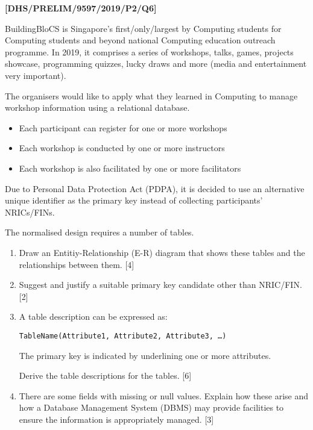 \item \textbf{{[}DHS/PRELIM/9597/2019/P2/Q6{]} }

BuildingBloCS is Singapore's first/only/largest by Computing students
for Computing students and beyond national Computing education outreach
programme. In 2019, it comprises a series of workshops, talks, games,
projects showcase, programming quizzes, lucky draws and more (media
and entertainment very important). 

The organisers would like to apply what they learned in Computing
to manage workshop information using a relational database. 
\begin{itemize}
\item Each participant can register for one or more workshops 
\item Each workshop is conducted by one or more instructors 
\item Each workshop is also facilitated by one or more facilitators 
\end{itemize}
Due to Personal Data Protection Act (PDPA), it is decided to use an
alternative unique identifier as the primary key instead of collecting
participants' NRICs/FINs.

The normalised design requires a number of tables.
\begin{enumerate}
\item Draw an Entitiy-Relationship (E-R) diagram that shows these tables
and the relationships between them. \hfill{} {[}4{]}
\item Suggest and justify a suitable primary key candidate other than NRIC/FIN.
\hfill{} {[}2{]}
\item A table description can be expressed as:

\texttt{TableName(Attribute1, Attribute2, Attribute3, \dots )}

The primary key is indicated by underlining one or more attributes.

Derive the table descriptions for the tables. \hfill{}{[}6{]}
\item There are some fields with missing or null values. Explain how these
arise and how a Database Management System (DBMS) may provide facilities
to ensure the information is appropriately managed. \hfill{}{[}3{]}
\end{enumerate}